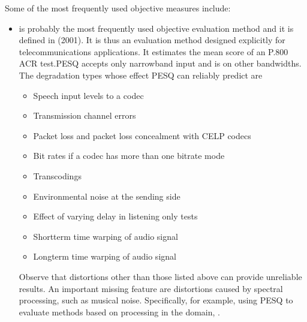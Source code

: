\documentclass[letterpaper,10pt,english]{jupyterBook}
\begin{document}
\sphinxAtStartPar
Some of the most frequently used objective measures include:
\begin{itemize}
\item {} 
\sphinxAtStartPar
{} is probably the most
frequently used objective evaluation method and it is defined in
 (2001). It is thus
an evaluation method designed explicitly for telecommunications
applications. It estimates the mean score of an P.800 ACR test.PESQ accepts only narrow\sphinxhyphen{}band input and is 
on other bandwidths. The degradation types whose effect PESQ can
reliably predict are
\begin{itemize}
\item {} 
\sphinxAtStartPar
Speech input levels to a codec

\item {} 
\sphinxAtStartPar
Transmission channel errors

\item {} 
\sphinxAtStartPar
Packet loss and packet loss concealment with CELP codecs

\item {} 
\sphinxAtStartPar
Bit rates if a codec has more than one bit\sphinxhyphen{}rate mode

\item {} 
\sphinxAtStartPar
Transcodings

\item {} 
\sphinxAtStartPar
Environmental noise at the sending side

\item {} 
\sphinxAtStartPar
Effect of varying delay in listening only tests

\item {} 
\sphinxAtStartPar
Short\sphinxhyphen{}term time warping of audio signal

\item {} 
\sphinxAtStartPar
Long\sphinxhyphen{}term time warping of audio signal

\end{itemize}

\sphinxAtStartPar
Observe that distortions other than those listed above can provide
unreliable results. An important missing feature are distortions
caused by spectral processing, such as musical noise. Specifically,
for example, using PESQ to evaluate  methods based on processing in the
 domain, .


\end{itemize}
\end{document}
